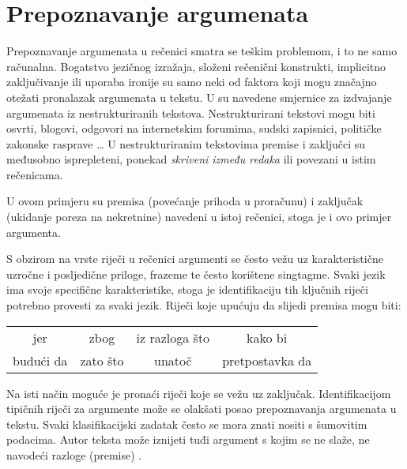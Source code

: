\section{Prepoznavanje argumenata}

Prepoznavanje argumenata u rečenici smatra se teškim problemom, i to ne samo računalna. Bogatstvo jezičnog izražaja, složeni rečenični konstrukti, implicitno zaključivanje ili uporaba ironije su samo neki od faktora koji mogu značajno otežati pronalazak argumenata u tekstu. U \citep{harrellcreating} su navedene smjernice za izdvajanje argumenata iz nestrukturiranih tekstova. Nestrukturirani tekstovi mogu biti osvrti, blogovi, odgovori na internetskim forumima, sudski zapisnici, političke zakonske rasprave \dots
U nestrukturiranim tekstovima premise i zaključci su međusobno isprepleteni, ponekad \emph{skriveni između redaka} ili povezani u istim rečenicama. 
\vspace{1 mm}

\vspace{2 mm}

U ovom primjeru su premisa (povećanje prihoda u proračunu) i zaključak
(ukidanje poreza na nekretnine) navedeni u istoj rečenici, stoga je i ovo
primjer argumenta.

S obzirom na vrste riječi u rečenici argumenti se često vežu uz karakteristične
uzročne i posljedične priloge, frazeme te često korištene singtagme. Svaki
jezik ima svoje specifične karakteristike, stoga je identifikaciju tih ključnih
riječi potrebno provesti za svaki jezik. Riječi koje upućuju da slijedi premisa
mogu biti: \begin{center} \begin{tabular}{c c c c} jer & zbog & iz razloga što
                                                       & kako bi  \\ budući da
                                                       & zato što & unatoč &
pretpostavka da \end{tabular} \end{center}

Na isti način moguće je pronaći riječi koje se vežu uz zaključak. Identifikacijom tipičnih riječi za argumente može se olakšati posao prepoznavanja argumenata u tekstu. 
Svaki klasifikacijski zadatak često se mora znati nositi s šumovitim podacima. 
Autor teksta može iznijeti tuđi argument s kojim se ne slaže, ne navodeći razloge (premise) .

